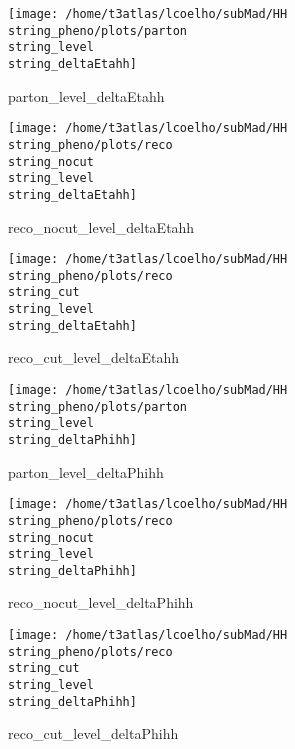 \documentclass[a4paper,onecolumn,final,11pt]{article}
\begin{document}
\begin{figure}[H] 
\centering 
\begin{minipage}{.32\textwidth} 
        \centering 
        \hspace{0cm} 
        \texttt{[image: /home/t3atlas/lcoelho/subMad/HH\\string\_pheno/plots/parton\\string\_level\\string\_deltaEtahh]} 
        \caption{parton_level_deltaEtahh} 
\end{minipage} 
\hfill 
\begin{minipage}{.32\textwidth} 
        \centering 
        \hspace{0cm} 
    \texttt{[image: /home/t3atlas/lcoelho/subMad/HH\\string\_pheno/plots/reco\\string\_nocut\\string\_level\\string\_deltaEtahh]} 
        \caption{reco_nocut_level_deltaEtahh} 
\end{minipage} 
\hfill 
\begin{minipage}{.32\textwidth} 
        \centering 
        \hspace{0cm} 
    \texttt{[image: /home/t3atlas/lcoelho/subMad/HH\\string\_pheno/plots/reco\\string\_cut\\string\_level\\string\_deltaEtahh]} 
        \caption{reco_cut_level_deltaEtahh} 
\end{minipage} 
\end{figure} 
 
\begin{figure}[H] 
\centering 
\begin{minipage}{.32\textwidth} 
        \centering 
        \hspace{0cm} 
        \texttt{[image: /home/t3atlas/lcoelho/subMad/HH\\string\_pheno/plots/parton\\string\_level\\string\_deltaPhihh]} 
        \caption{parton_level_deltaPhihh} 
\end{minipage} 
\hfill 
\begin{minipage}{.32\textwidth} 
        \centering 
        \hspace{0cm} 
    \texttt{[image: /home/t3atlas/lcoelho/subMad/HH\\string\_pheno/plots/reco\\string\_nocut\\string\_level\\string\_deltaPhihh]} 
        \caption{reco_nocut_level_deltaPhihh} 
\end{minipage} 
\hfill 
\begin{minipage}{.32\textwidth} 
        \centering 
        \hspace{0cm} 
    \texttt{[image: /home/t3atlas/lcoelho/subMad/HH\\string\_pheno/plots/reco\\string\_cut\\string\_level\\string\_deltaPhihh]} 
        \caption{reco_cut_level_deltaPhihh} 
\end{minipage} 
\end{figure} 
 
\end{document}
